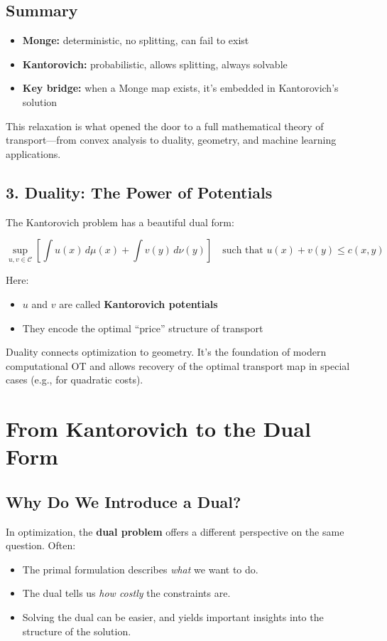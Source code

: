\documentclass[11pt]{article}
\begin{document}
\subsection*{Summary}
\begin{center}
\begin{tcolorbox}[colback=white,colframe=blue!75!black,title=Monge vs. Kantorovich]
\begin{itemize}
  \item \textbf{Monge:} deterministic, no splitting, can fail to exist
  \item \textbf{Kantorovich:} probabilistic, allows splitting, always solvable
  \item \textbf{Key bridge:} when a Monge map exists, it's embedded in Kantorovich’s solution
\end{itemize}
\end{tcolorbox}
\end{center}

This relaxation is what opened the door to a full mathematical theory of transport---from convex analysis to duality, geometry, and machine learning applications.


\subsection*{3. Duality: The Power of Potentials}

The Kantorovich problem has a beautiful dual form:

\[
\sup_{u, v \in \mathcal{C}} \left[ \int u(x)\,d\mu(x) + \int v(y)\,d\nu(y) \right] \quad \text{such that } u(x) + v(y) \leq c(x, y)
\]

Here:
\begin{itemize}
  \item $u$ and $v$ are called \textbf{Kantorovich potentials}
  \item They encode the optimal “price” structure of transport
\end{itemize}

Duality connects optimization to geometry. It’s the foundation of modern computational OT and allows recovery of the optimal transport map in special cases (e.g., for quadratic costs).

\section*{From Kantorovich to the Dual Form}

\subsection*{Why Do We Introduce a Dual?}
In optimization, the \textbf{dual problem} offers a different perspective on the same question. Often:
\begin{itemize}
  \item The primal formulation describes \emph{what} we want to do.
  \item The dual tells us \emph{how costly} the constraints are.
  \item Solving the dual can be easier, and yields important insights into the structure of the solution.
\end{itemize}
\end{document}
